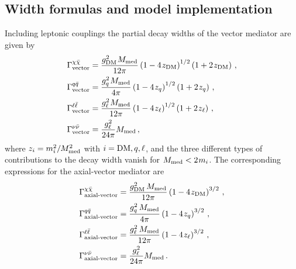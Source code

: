 \documentclass[review]{elsarticle}
\newcommand{\mmed}{\ensuremath{M_{\rm{med}}}\xspace}
\newcommand{\gDM}{\ensuremath{g_{\rm{DM}}}\xspace}
\newcommand{\gq}{\ensuremath{g_q}\xspace}
\begin{document}
\subsection{Width formulas and model implementation}

Including leptonic couplings the partial decay widths of the vector mediator are given by
\begin{align}
\Gamma_{\text{vector}}^{\chi\bar{\chi}} & = \frac{\gDM^2 \hspace{0.25mm} \mmed}{12\pi} 
 \left (1-4 \hspace{0.25mm}  z_{\rm{DM}} \right )^{1/2} \left(1 + 2 \hspace{0.25mm}  z_{\rm{DM}} \right) \, , \\
\Gamma_{\text{vector}}^{q\bar{q}} & = \frac{\gq^2 \hspace{0.25mm}  \mmed}{4\pi} 
 \left ( 1-4 \hspace{0.25mm}  z_q \right )^{1/2}   \left(1 + 2 \hspace{0.25mm}  z_q \right) \, , \\
 \Gamma_{\text{vector}}^{\ell\bar{\ell}} & = \frac{g_\ell^2 \hspace{0.25mm}  \mmed}{12\pi} 
 \left ( 1-4 \hspace{0.25mm}  z_\ell \right )^{1/2}   \left(1 + 2 \hspace{0.25mm}  z_\ell \right) \, , \\
 \Gamma_{\rm vector}^{\nu\bar{\nu}} & = \frac{g_\ell^2}{24\pi} \mmed \, , 
\end{align}
where $z_i = m_i^2/\mmed^2$ with $i={\rm DM},q,\ell$, and the three different types of contributions to the decay width vanish for $\mmed < 2 \hspace{0.25mm}  m_i$. 
The corresponding expressions for the axial-vector mediator are
\begin{align}
\Gamma_{\text{axial-vector}}^{\chi\bar{\chi}} & = \frac{\gDM^2 \, \mmed}{12\pi} 
\left ( 1-4 \hspace{0.25mm} z_{\rm{DM}} \right ) ^{3/2} \,, \\ 
  \Gamma_{\text{axial-vector}}^{q\bar{q}} & =  \frac{\gq^2 \, \mmed}{4\pi} 
\left ( 1-4 \hspace{0.25mm} z_q \right ) ^{3/2} \, , \\
  \Gamma_{\text{axial-vector}}^{\ell\bar{\ell}} & =  \frac{g_\ell^2 \, \mmed}{12\pi} 
\left ( 1-4 \hspace{0.25mm} z_\ell \right ) ^{3/2} \, , \\
 \Gamma_{\text{axial-vector}}^{\nu\bar{\nu}} & = \frac{g_\ell^2}{24\pi} \mmed \, .   
\end{align}
\end{document}
